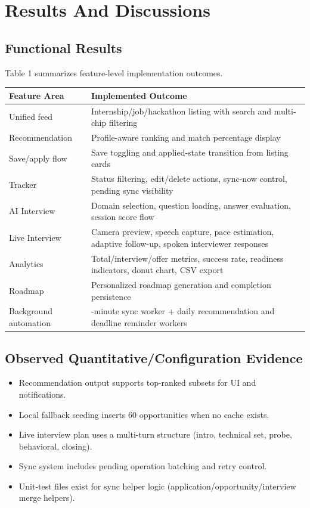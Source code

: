 \documentclass[conference]{IEEEtran}
\begin{document}
\section{Results And Discussions}

\subsection{Functional Results}

Table 1 summarizes feature-level implementation outcomes.

\begin{table}[!tb]
\centering
\setlength{\tabcolsep}{4pt}
\normalsize
\begin{tabularx}{\textwidth}{|>{\RaggedRight\arraybackslash}X|>{\RaggedRight\arraybackslash}X|}
\hline
 \textbf{Feature Area} & \textbf{Implemented Outcome} \\
\hline
 Unified feed & Internship/job/hackathon listing with search and multi-chip filtering \\
\hline
 Recommendation & Profile-aware ranking and match percentage display \\
\hline
 Save/apply flow & Save toggling and applied-state transition from listing cards \\
\hline
 Tracker & Status filtering, edit/delete actions, sync-now control, pending sync visibility \\
\hline
 AI Interview & Domain selection, question loading, answer evaluation, session score flow \\
\hline
 Live Interview & Camera preview, speech capture, pace estimation, adaptive follow-up, spoken interviewer responses \\
\hline
 Analytics & Total/interview/offer metrics, success rate, readiness indicators, donut chart, CSV export \\
\hline
 Roadmap & Personalized roadmap generation and completion persistence \\
\hline
 Background automation & 15-minute sync worker + daily recommendation and deadline reminder workers \\
\hline
\end{tabularx}
\end{table}

\subsection{Observed Quantitative/Configuration Evidence}

\begin{itemize}
  \item Recommendation output supports top-ranked subsets for UI and notifications.
  \item Local fallback seeding inserts 60 opportunities when no cache exists.
  \item Live interview plan uses a multi-turn structure (intro, technical set, probe, behavioral, closing).
  \item Sync system includes pending operation batching and retry control.
  \item Unit-test files exist for sync helper logic (application/opportunity/interview merge helpers).
\end{itemize}
\end{document}
